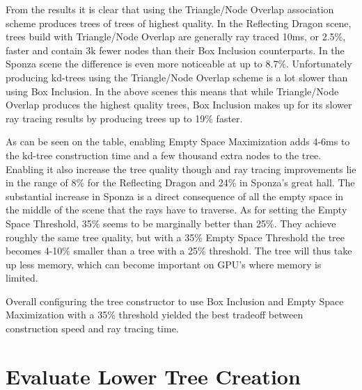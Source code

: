 From the results it is clear that using the Triangle/Node Overlap association
scheme produces trees of trees of highest quality. In the Reflecting Dragon
scene, trees build with Triangle/Node Overlap are generally ray traced 10ms, or
2.5\%, faster and contain 3k fewer nodes than their Box Inclusion
counterparts. In the Sponza scene the difference is even more noticeable at up
to 8.7\%. Unfortunately producing kd-trees using the Triangle/Node Overlap scheme
is a lot slower than using Box Inclusion. In the above scenes this means that
while Triangle/Node Overlap produces the highest quality trees, Box Inclusion
makes up for its slower ray tracing results by producing trees up to 19\%
faster.

As can be seen on the table, enabling Empty Space Maximization adds 4-6ms to the
kd-tree construction time and a few thousand extra nodes to the tree. Enabling
it also increase the tree quality though and ray tracing improvements lie in the
range of 8\% for the Reflecting Dragon and 24\% in Sponza's great hall. The
substantial increase in Sponza is a direct consequence of all the empty space in
the middle of the scene that the rays have to traverse. As for setting the Empty
Space Threshold, 35\% seems to be marginally better than 25\%. They achieve
roughly the same tree quality, but with a 35\% Empty Space Threshold the tree
becomes 4-10\% smaller than a tree with a 25\% threshold. The tree will thus
take up less memory, which can become important on GPU's where memory is
limited.

Overall configuring the tree constructor to use Box Inclusion and Empty Space
Maximization with a 35\% threshold yielded the best tradeoff between
construction speed and ray tracing time.

\section{Evaluate Lower Tree Creation}\label{sec:evaluateLowerTree}


